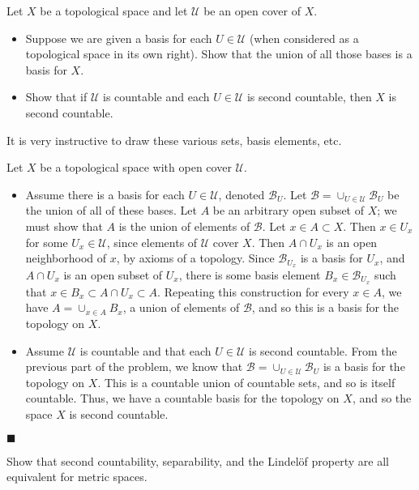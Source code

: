 \documentclass[12pt]{article}
\renewcommand{\qed}{\hfill$\blacksquare$}
\renewenvironment{proof}{\begin{addmargin}[1em]{0em}\begin{newproof}}{\end{newproof}\end{addmargin}\qed}
\newenvironment{problem}[2][Problem]{\begin{trivlist}
\item[\hskip \labelsep {\bfseries #1}\hskip \labelsep {\bfseries #2.}]}{\end{trivlist}}
\begin{document}
\begin{problem}{2-19}
	Let $X$ be a topological space and let $\mathcal{U}$ be an open cover of $X$.
	\begin{itemize}
		\item Suppose we are given a basis for each $U \in \mathcal{U}$ (when considered as a topological space in its own right). Show that the union of all those bases is a basis for $X$.
		\item Show that if $\mathcal{U}$ is countable and each $U\in \mathcal{U}$ is second countable, then $X$ is second countable.
	\end{itemize}
\end{problem}
{\color{red} It is very instructive to draw these various sets, basis elements, etc.} \\
\begin{proof}
Let $X$ be a topological space with open cover $\mathcal{U}$.
\begin{itemize}
	\item Assume there is a basis for each $U \in \mathcal{U}$, denoted $\mathcal{B}_{U}$. Let $\mathcal{B} = \cup_{U\in \mathcal{U}} \mathcal{B}_{U}$ be the union of all of these bases. Let $A$ be an arbitrary open subset of $X$; we must show that $A$ is the union of elements of $\mathcal{B}$. Let $x\in A \subset X$. Then $x\in U_x$ for some $U_x \in \mathcal{U}$, since elements of $\mathcal{U}$ cover $X$. Then $A\cap U_x$ is an open neighborhood of $x$, by axioms of a topology. Since $\mathcal{B}_{U_x}$ is a basis for $U_{x}$, and $A\cap U_x$ is an open subset of $U_x$, there is some basis element $B_x \in \mathcal{B}_{U_x}$ such that $x\in B_x \subset A\cap U_x \subset A$. Repeating this construction for every $x\in A$, we have $A = \cup_{x\in A} B_x$, a union of elements of $\mathcal{B}$, and so this is a basis for the topology on $X$.

	\item Assume $\mathcal{U}$ is countable and that each $U\in \mathcal{U}$ is second countable. From the previous part of the problem, we know that $\mathcal{B}=\cup_{U\in \mathcal{U}} \mathcal{B}_U$ is a basis for the topology on $X$. This is a countable union of countable sets, and so is itself countable. Thus, we have a countable basis for the topology on $X$, and so the space $X$ is second countable.
\end{itemize}
\end{proof}




\begin{problem}{2-20}
Show that second countability, separability, and the Lindel{\"o}f property are all equivalent for metric spaces.
\end{problem}
\end{document}
